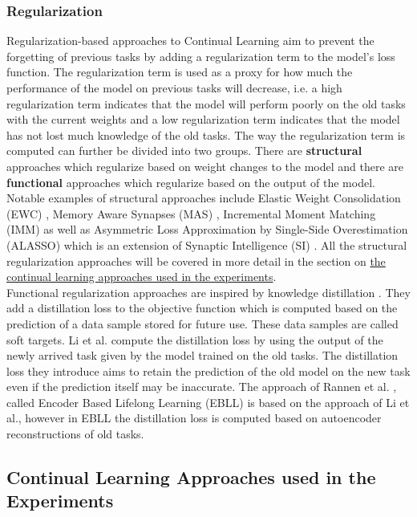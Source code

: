\subsubsection{Regularization}
Regularization-based approaches to Continual Learning aim to prevent the forgetting of previous tasks by adding a regularization term to the model's loss function. The regularization term is used as a proxy for how much the
performance of the model on previous tasks will decrease, i.e. a high regularization term indicates that the model will perform poorly on the old tasks with the current weights and a low regularization term indicates that
the model has not lost much knowledge of the old tasks. The way the regularization term is computed can further be divided into two groups. There are \textbf{structural} approaches which regularize based on weight changes
to the model and there are \textbf{functional} approaches which regularize based on the output of the model. Notable examples of structural approaches include Elastic Weight Consolidation (EWC) \cite{kirkpatrick2017overcoming},
Memory Aware Synapses (MAS) \cite{aljundi2018memory}, Incremental Moment Matching (IMM) \cite{lee2017overcoming} as well as Asymmetric Loss Approximation by Single-Side Overestimation (ALASSO) \cite{park2019continual} which
is an extension of Synaptic Intelligence (SI) \cite{zenke2017continual}. All the structural regularization approaches will be covered in more detail in the section on
\href{sec:Related_work:Continual_Learning:Experiments}{the continual learning approaches used in the experiments}. \\
Functional regularization approaches are inspired by knowledge distillation \cite{hinton2015distilling}. They add a distillation
loss to the objective function which is computed based on the prediction of a data sample stored for future use. These data samples are called soft targets. Li et al. \cite{li2017learning} compute the distillation loss by using the output of
the newly arrived task given by the model trained on the old tasks. The distillation loss they introduce aims to retain the prediction of the old model on the new task even if the prediction itself may be inaccurate. The approach of Rannen et al.
\cite{rannen2017encoder}, called Encoder Based Lifelong Learning (EBLL) is based on the approach of Li et al., however in EBLL the distillation loss is computed based on autoencoder reconstructions of old tasks.
\subsection{Continual Learning Approaches used in the Experiments}
\label{sec:Related_work:Continual_Learning:Experiments}
